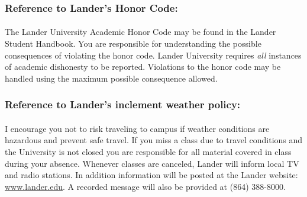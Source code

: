 \documentclass{article}
\begin{document}

    \begin{samepage}
      \subsubsection*{Reference to Lander’s Honor Code:}
      \paragraph*{}
  The Lander University Academic Honor Code may be found in the Lander Student Handbook.
  You are responsible for understanding the possible consequences of violating the honor code.
  Lander University requires \emph{all} instances of academic dishonesty to be reported.
  Violations to the honor code may be handled using the maximum possible consequence allowed.

    \end{samepage}

    \begin{samepage}
      \subsubsection*{Reference to Lander’s inclement weather policy:}
      \paragraph*{}
  I encourage you not to risk traveling to campus if weather conditions are hazardous and prevent safe travel.
  If you miss a class due to travel conditions and the University is not closed you are responsible for all material covered in class during your absence.
  Whenever classes are canceled, Lander will inform local TV and radio stations.
  In addition information will be posted at the Lander website: \href{www.lander.edu}{www.lander.edu}.
  A recorded message will also be provided at (864) 388-8000.

  \mbox{} %
    \end{samepage}
\end{document}
